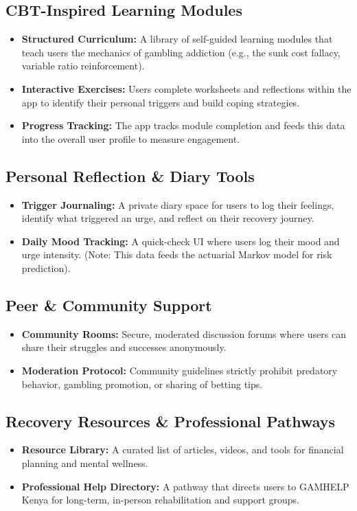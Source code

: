 \documentclass[11pt,a4paper]{article}
\begin{document}
\subsection{CBT-Inspired Learning Modules}
\begin{itemize}
    \item \textbf{Structured Curriculum:} A library of self-guided learning modules that teach users the mechanics of gambling addiction (e.g., the sunk cost fallacy, variable ratio reinforcement).
    \item \textbf{Interactive Exercises:} Users complete worksheets and reflections within the app to identify their personal triggers and build coping strategies.
    \item \textbf{Progress Tracking:} The app tracks module completion and feeds this data into the overall user profile to measure engagement.
\end{itemize}

\subsection{Personal Reflection \& Diary Tools}
\begin{itemize}
    \item \textbf{Trigger Journaling:} A private diary space for users to log their feelings, identify what triggered an urge, and reflect on their recovery journey.
    \item \textbf{Daily Mood Tracking:} A quick-check UI where users log their mood and urge intensity. (Note: This data feeds the actuarial Markov model for risk prediction).
\end{itemize}

\subsection{Peer \& Community Support}
\begin{itemize}
    \item \textbf{Community Rooms:} Secure, moderated discussion forums where users can share their struggles and successes anonymously.
    \item \textbf{Moderation Protocol:} Community guidelines strictly prohibit predatory behavior, gambling promotion, or sharing of betting tips. 
\end{itemize}

\subsection{Recovery Resources \& Professional Pathways}
\begin{itemize}
    \item \textbf{Resource Library:} A curated list of articles, videos, and tools for financial planning and mental wellness.
    \item \textbf{Professional Help Directory:} A pathway that directs users to GAMHELP Kenya for long-term, in-person rehabilitation and support groups.
\end{itemize}
\end{document}
